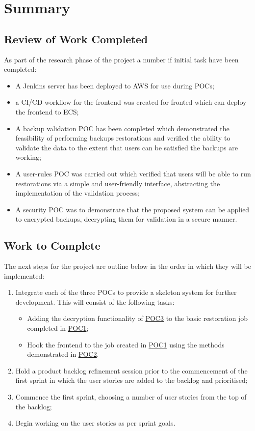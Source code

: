 
\section{Summary}
	\subsection{Review of Work Completed}
	As part of the research phase of the project a number if initial task have been completed:
	\begin{itemize}
		\item A Jenkins server has been deployed to AWS for use during POCs;
		\item a CI/CD workflow for the frontend was created for fronted which can deploy the frontend to ECS;
		\item A backup validation POC has been completed which demonstrated the feasibility of performing backups restorations and verified the ability to validate the data to the extent that users can be satisfied the backups are working;
		\item A user-rules POC was carried out which verified that users will be able to run restorations via a simple and user-friendly interface, abstracting the implementation of the validation process;
		\item A security POC was to demonstrate that the proposed system can be applied to encrypted backups, decrypting them for validation in a secure manner.
	\end{itemize}
	
	\subsection{Work to Complete}
	The next steps for the project are outline below in the order in which they will be implemented:
	\begin{enumerate}
		\item Integrate each of the three POCs to provide a skeleton system for further development. This will consist of the following tasks:
		\begin{itemize}
			\item Adding the decryption functionality of \hyperref[poc1]{POC3} to the basic restoration job completed in \hyperref[poc1]{POC1};
			\item Hook the frontend to the job created in \hyperref[poc1]{POC1} using the methods demonstrated in \hyperref[poc1]{POC2}.
		\end{itemize}
		\item Hold a product backlog refinement session prior to the commencement of the first sprint in which the user stories are added to the backlog and prioritised;
		\item Commence the first sprint, choosing a number of user stories from the top of the backlog;
		\item Begin working on the user stories as per sprint goals.
	\end{enumerate}
